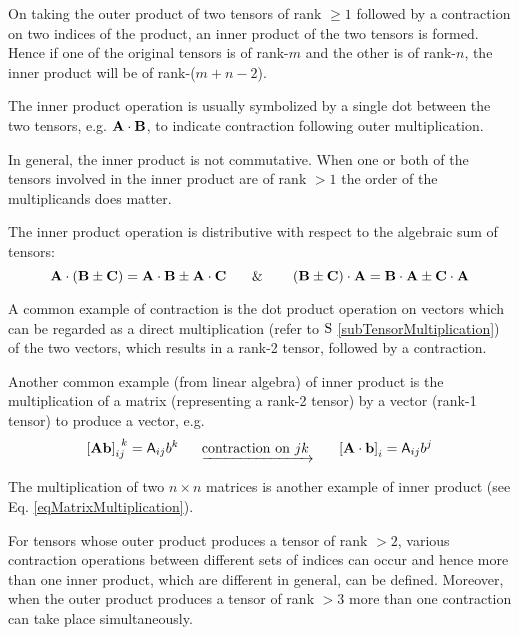  On taking the outer product 
of two tensors of rank $\ge1$ followed by a contraction on two indices
of the product, an inner product of the two tensors is formed. Hence
if one of the original tensors is of rank-$m$ and the other is of
rank-$n$, the inner product will be of rank-($m+n-2$).

 The inner product operation is usually symbolized by a
single dot between the two tensors, e.g. $\vector{A}\cdot\vector{B}$,
to indicate contraction following outer multiplication.

 In general, the inner product is not commutative. When
one or both of the tensors involved in the inner product are of rank
$>1$ the order of the multiplicands does matter.

 The inner product operation is distributive with respect
to the algebraic sum of tensors:
\begin{equation}
\vector{A}\cdot\left(\vector{B}\pm\vector{C}\right)=\vector{A}\cdot\vector{B}\pm\vector{A}\cdot\vector{C}\,\,\,\,\,\,\,\,\,\,\,\&\,\,\,\,\,\,\,\,\,\,\,\,\left(\vector{B}\pm\vector{C}\right)\cdot\vector{A}=\vector{B}\cdot\vector{A}\pm\vector{C}\cdot\vector{A}
\end{equation}


 \begin{exa}
 A common example of contraction is the dot product operation
on vectors which can be regarded as a direct multiplication (refer
to $\S$ \ref{subTensorMultiplication}) of the two vectors, which
results in a rank-2 tensor, followed by a contraction.
  
 \end{exa}


 \begin{exa}
 Another common example (from linear algebra) of inner product
is the multiplication of a matrix (representing a rank-2 tensor)  by a vector (rank-1 tensor) to produce a vector,
e.g.
\begin{equation}
\left[\vector{A}\vector{b}\right]_{ij}^{\,\,\,k}=\tsor{A}_{ij}b^{k}\,\,\,\,\,\,\,\,\,\,\underrightarrow{\mathrm{contraction\,\,on}\,\,jk\,\,}\,\,\,\,\,\,\,\,\,\,\left[\vector{A}\cdot\vector{b}\right]_{i}=\tsor{A}_{ij}b^{j}
\end{equation}
\end{exa}


The multiplication of two $n\times n$ matrices is another example
of inner product (see Eq. \ref{eqMatrixMultiplication}).

 For tensors whose outer product produces a tensor of rank
$>2$, various contraction operations between different sets of indices
can occur and hence more than one inner product, which are different
in general, can be defined. Moreover, when the outer product produces
a tensor of rank $>3$ more than one contraction can take place simultaneously.



